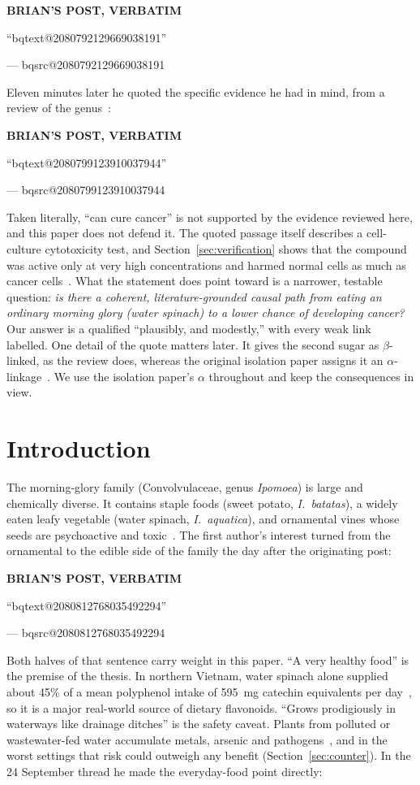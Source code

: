 \documentclass[11pt,a4paper]{article}
\makeatletter
\newcommand{\BQ}[1]{\begin{tcolorbox}[bqstyle]%
{\sffamily\bfseries\footnotesize\color{teal!80!black}BRIAN'S POST, VERBATIM}\par\smallskip
``\csname bqtext@#1\endcsname''\par\smallskip
{\raggedleft\footnotesize --- \csname bqsrc@#1\endcsname\par}\end{tcolorbox}}
\makeatother
\begin{document}
\BQ{2080792129669038191}

\noindent Eleven minutes later he quoted the specific evidence he had in mind, from a review of the genus~\cite{meira2012}:

\BQ{2080799123910037944}

\noindent Taken literally, ``can cure cancer'' is not supported by the evidence reviewed here, and this paper does not defend it. The quoted passage itself describes a cell-culture cytotoxicity test, and Section~\ref{sec:verification} shows that the compound was active only at very high concentrations and harmed normal cells as much as cancer cells~\cite{prasad2005b,meira2012}. What the statement does point toward is a narrower, testable question: \emph{is there a coherent, literature-grounded causal path from eating an ordinary morning glory (water spinach) to a lower chance of developing cancer?} Our answer is a qualified ``plausibly, and modestly,'' with every weak link labelled. One detail of the quote matters later. It gives the second sugar as $\beta$-linked, as the review does, whereas the original isolation paper assigns it an $\alpha$-linkage~\cite{prasad2005}. We use the isolation paper's $\alpha$ throughout and keep the consequences in view.

\section{Introduction}
\label{sec:intro}

The morning-glory family (Convolvulaceae, genus \emph{Ipomoea}) is large and chemically diverse. It contains staple foods (sweet potato, \emph{I.~batatas}), a widely eaten leafy vegetable (water spinach, \emph{I.~aquatica}), and ornamental vines whose seeds are psychoactive and toxic~\cite{meira2012,juszczak2013}. The first author's interest turned from the ornamental to the edible side of the family the day after the originating post:

\BQ{2080812768035492294}

\noindent Both halves of that sentence carry weight in this paper. ``A very healthy food'' is the premise of the thesis. In northern Vietnam, water spinach alone supplied about 45\% of a mean polyphenol intake of 595~mg catechin equivalents per day~\cite{thu2004}, so it is a major real-world source of dietary flavonoids. ``Grows prodigiously in waterways like drainage ditches'' is the safety caveat. Plants from polluted or wastewater-fed water accumulate metals, arsenic and pathogens~\cite{gothberg2002,vuong2007,wu2026}, and in the worst settings that risk could outweigh any benefit (Section~\ref{sec:counter}). In the 24 September thread he made the everyday-food point directly:
\end{document}
